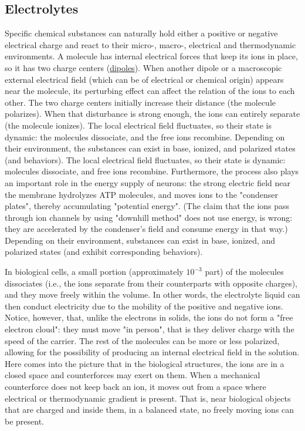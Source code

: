 \subsection{Electrolytes\label{sec:Physics-Electrolytes}}	
Specific chemical substances can naturally hold either a positive or negative electrical charge and react to their micro-, macro-, electrical and thermodynamic environments.
A molecule has internal electrical forces that keep its ions in place, so it has two charge centers (\href{http://hyperphysics.phy-astr.gsu.edu/hbase/hframe.html}{dipoles}).
When another dipole or a macroscopic external electrical field (which can be of electrical or chemical origin) appears near the molecule, its perturbing effect can affect the relation of the ions to each other.
The two charge centers initially increase their distance (the molecule polarizes).
When that disturbance is strong enough, the ions can entirely separate (the molecule ionizes).
The local electrical field fluctuates, so their state is dynamic: the molecules dissociate,
and the free ions recombine. Depending on their environment, the substances can exist in base,
ionized, and polarized states (and behaviors).
The local electrical field fluctuates, so their state is dynamic: molecules dissociate,
and free ions recombine.
Furthermore, the process also plays an important role in the energy supply of neurons:
the strong electric field near the membrane hydrolyzes \gls{ATP} molecules, and moves ions to the
"condenser plates", thereby accumulating "potential energy".
(The claim that the ions pass through ion channels by using "downhill method"
does not use energy, is wrong: they are accelerated by the condenser's field
and consume energy in that way.)  Depending on their environment,
substances can exist in base, ionized, and polarized states (and exhibit corresponding behaviors).

In biological cells, a small portion (approximately $10^{-3}$ part) of the molecules dissociates (i.e., the ions separate from their counterparts with opposite charges), and they move freely within the volume. 
In other words, the electrolyte liquid can then conduct electricity due to the mobility of the positive and negative ions. 
Notice, however, that, unlike the electrons in solids, the ions do not form a "free electron cloud": they must move "in person", that is
they deliver charge with the speed of the carrier.
The rest of the molecules can be more or less polarized, allowing for the possibility of producing an internal electrical field in the solution. Here comes into the picture that in the biological structures, the ions are in a closed space and counterforces
may exert on them. When a mechanical counterforce does not keep back
an ion, it moves out from a space where electrical or thermodynamic 
gradient is present. That is, near biological objects that are charged and inside them, in a balanced state, no freely moving ions can be present. 


